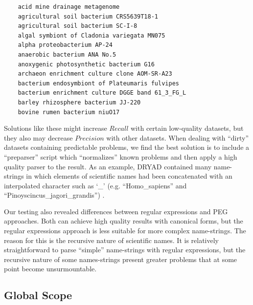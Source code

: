 \documentclass{bmcart}
\begin{document}
\vspace{0.5cm}

\begin{verbatim}
    acid mine drainage metagenome
    agricultural soil bacterium CRS5639T18-1
    agricultural soil bacterium SC-I-8
    algal symbiont of Cladonia variegata MN075
    alpha proteobacterium AP-24
    anaerobic bacterium ANA No.5
    anoxygenic photosynthetic bacterium G16
    archaeon enrichment culture clone AOM-SR-A23
    bacterium endosymbiont of Plateumaris fulvipes
    bacterium enrichment culture DGGE band 61_3_FG_L
    barley rhizosphere bacterium JJ-220
    bovine rumen bacterium niuO17
\end{verbatim}

\vspace{0.5cm}

Solutions like these might increase $Recall$ with certain low-quality datasets,
but they also may decrease $Precision$ with other datasets. When dealing with
``dirty'' datasets containing predictable problems, we find the best solution is
to include a ``preparser'' script which ``normalizes'' known problems  and then
apply a high quality parser to the result.  As an example, DRYAD contained many name-strings in which elements of
scientific names had been concatenated with an interpolated character such
as `\_’ (e.g. ``Homo\_sapiens'' and ``Pinoyscincus\_jagori\_grandis'')
\cite{Patterson:inpress-a}.

Our testing also revealed differences between regular expressions and PEG
approaches. Both can achieve high quality results with canonical forms, but the
regular expressions approach is less suitable for more complex name-strings.
The reason for this is the recursive nature of scientific names.  It is
relatively straightforward to parse ``simple'' name-strings with regular
expressions, but the recursive nature of some names-strings present greater
problems that at some point become unsurmountable.


\subsection*{Global Scope}
\end{document}
